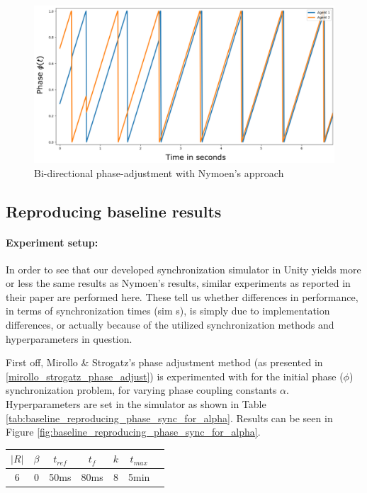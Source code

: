 		\begin{figure}[h]
			\centering
			\includegraphics[width=0.9\linewidth]{Assets/DocSegments/Chapters/ExperimentsAndResults/Figures/Validations/KNymoenPhaseAdjustmentSecondTry.pdf}
			\caption[Illustration of Nymoen's bi-directional phase adjustment ($Adj_{\phi}$) method.]{Bi-directional phase-adjustment with Nymoen's approach}
			\label{fig:nymoen_phase}
		\end{figure}
	
	\subsection{Reproducing baseline results}
	
		\paragraph{Experiment setup:\nl}
		
		In order to see that our developed synchronization simulator in Unity yields more or less the same results as Nymoen's results, similar experiments as reported in their paper are performed here. These tell us whether differences in performance, in terms of synchronization times (sim s), is simply due to implementation differences, or actually because of the utilized synchronization methods and hyperparameters in question. 
		
		First off, Mirollo \& Strogatz's phase adjustment method (as presented in \ref{mirollo_strogatz_phase_adjust}) is experimented with for the initial phase ($\phi$) synchronization problem, for varying phase coupling constants $\alpha$. Hyperparameters are set in the simulator as shown in Table \ref{tab:baseline_reproducing_phase_sync_for_alpha}. Results can be seen in Figure \ref{fig:baseline_reproducing_phase_sync_for_alpha}.
		
		\begin{center}
		\begin{tabular}{ |c|c|c|c|c|c|c| } 
		\hline
		$|R|$ & $\beta$ & $t_{ref}$ & $t_f$ & $k$ & $t_{max}$ \\
		\hline
		6 & 0 & 50ms & 80ms & 8 & 5min \\
		\hline
		\end{tabular}
		\label{tab:baseline_reproducing_phase_sync_for_alpha}
		\end{center}
		
